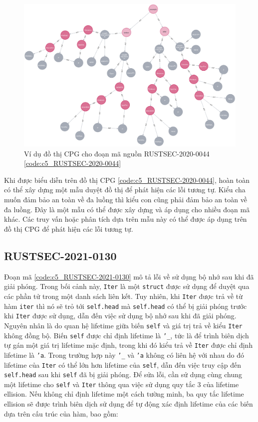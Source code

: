 \begin{figure}[H]
    \includegraphics[width=1\columnwidth]{figures/c5/c5_RUSTSEC-2020-0044.png}
    \centering
    \caption{Ví dụ đồ thị CPG cho đoạn mã nguồn RUSTSEC-2020-0044 \ref{code:c5_RUSTSEC-2020-0044}}
    \label{img:c5_RUSTSEC-2020-0044}
\end{figure}

Khi được biểu diễn trên đồ thị CPG \ref{code:c5_RUSTSEC-2020-0044}, hoàn toàn có thể xây dựng một mẫu duyệt đồ thị để phát hiện các lỗi tương tự.
Kiểu cha muốn đảm bảo an toàn về đa luồng thì kiểu con cũng phải đảm bảo an toàn về đa luồng.
Đây là một mẫu có thể được xây dựng và áp dụng cho nhiều đoạn mã khác.
Các truy vấn hoặc phân tích dựa trên mẫu này có thể được áp dụng trên đồ thị CPG để phát hiện các lỗi tương tự.

\subsection{RUSTSEC-2021-0130}

Đoạn mã \ref{code:c5_RUSTSEC-2021-0130} mô tả lỗi về sử dụng bộ nhớ sau khi đã giải phóng.
Trong bối cảnh này, \texttt{Iter} là một \texttt{struct} được sử dụng để duyệt qua các phần tử trong một danh sách liên kết.
Tuy nhiên, khi \texttt{Iter} được trả về từ hàm \texttt{iter} thì nó sẽ trỏ tới \texttt{self.head} mà \texttt{self.head} có thể bị giải phóng trước khi \texttt{Iter} được sử dụng, dẫn đến việc sử dụng bộ nhớ sau khi đã giải phóng.
Nguyên nhân là do quan hệ lifetime giữa biến \texttt{self} và giá trị trả về kiểu \texttt{Iter} không đồng bộ.
Biến \texttt{self} được chỉ định lifetime là \texttt{'\_}, tức là để trình biên dịch tự gán một giá trị lifetime mặc định, trong khi đó kiểu trả về \texttt{Iter} được chỉ định lifetime là \texttt{'a}.
Trong trường hợp này \texttt{'\_} và \texttt{'a} không có liên hệ với nhau do đó lifetime của \texttt{Iter} có thể lớn hơn lifetime của \texttt{self}, dẫn đến việc truy cập đến \texttt{self.head} sau khi \texttt{self} đã bị giải phóng.
Để sửa lỗi, cần sử dụng cùng chung một lifetime cho \texttt{self} và \texttt{Iter} thông qua việc sử dụng quy tắc 3 của lifetime ellision.
Nếu không chỉ định lifetime một cách tường minh, ba quy tắc lifetime ellision sẽ được trình biên dịch sử dụng để tự động xác định lifetime của các biến dựa trên cấu trúc của hàm, bao gồm:


